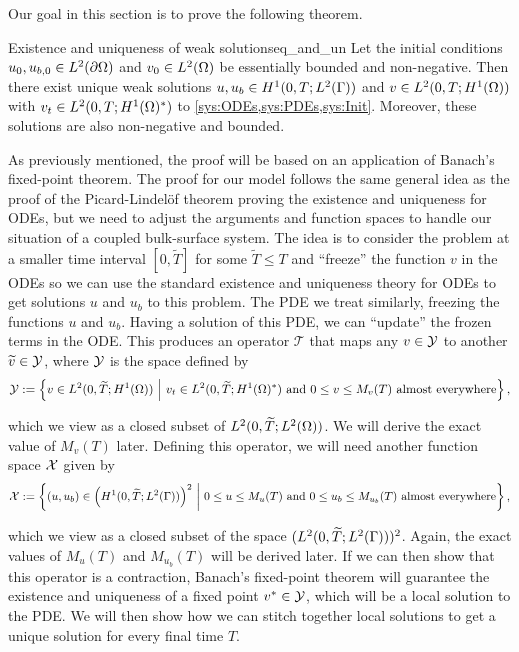 Our goal in this section is to prove the following theorem.

\begin{theorem}{Existence and uniqueness of weak solutions}{eq_and_un}
    Let the initial conditions $u_0, u_{b, 0} \in L^2(\partial \Omega)$ and $v_0 \in L^2(\Omega)$ be essentially bounded and non-negative. Then there exist unique weak solutions $u, u_b \in H^1(0, T; L^2(\Gamma))$ and $v \in L^2(0, T; H^1(\Omega))$ with $v_t \in L^2(0, T; H^1(\Omega)^*)$ to \cref{sys:ODEs,sys:PDEs,sys:Init}. Moreover, these solutions are also non-negative and bounded.
\end{theorem}

As previously mentioned, the proof will be based on an application of Banach's fixed-point theorem. The proof for our model follows the same general idea as the proof of the Picard-Lindel\"of theorem proving the existence and uniqueness for ODEs, but we need to adjust the arguments and function spaces to handle our situation of a coupled bulk-surface system. The idea is to consider the problem at a smaller time interval $[0, \widetilde{T}]$ for some $\widetilde{T} \leq T$ and ``freeze'' the function $v$ in the ODEs so we can use the standard existence and uniqueness theory for ODEs to get solutions $u$ and $u_b$ to this problem. The PDE we treat similarly, freezing the functions $u$ and $u_b$. Having a solution of this PDE, we can ``update'' the frozen terms in the ODE. This produces an operator $\mathcal{T}$ that maps any $v \in \mathcal{Y}$ to another $\widetilde{v} \in \mathcal{Y}$, where $\mathcal{Y}$ is the space defined by
%
\begin{equation*}
    \mathcal{Y} := \left\{ v \in L^2(0, \widetilde{T}; H^1(\Omega))\ \middle|\ v_t \in L^2(0, \widetilde{T}; H^1(\Omega)^*) \text{ and } 0 \leq v \leq M_v(T) \text{ almost everywhere} \right\},
\end{equation*}

\noindent
which we view as a closed subset of $L^2(0, \widetilde{T}; L^2(\Omega))$. We will derive the exact value of $M_v(T)$ later. Defining this operator, we will need another function space $\mathcal{X}$ given by
%
\begin{equation*}
    \mathcal{X} := \left\{ (u, u_b) \in \left(H^1(0, \widetilde{T}; L^2(\Gamma))\right)^2\ \middle|\ 0 \leq u \leq M_u(T) \text{ and } 0 \leq u_b \leq M_{u_b}(T) \text{ almost everywhere} \right\},
\end{equation*}

\noindent
which we view as a closed subset of the space $(L^2(0, \widetilde{T}; L^2(\Gamma)))^2$. Again, the exact values of $M_u(T)$ and $M_{u_b}(T)$ will be derived later. If we can then show that this operator is a contraction, Banach's fixed-point theorem will guarantee the existence and uniqueness of a fixed point $v^* \in \mathcal{Y}$, which will be a local solution to the PDE. We will then show how we can stitch together local solutions to get a unique solution for every final time $T$.

